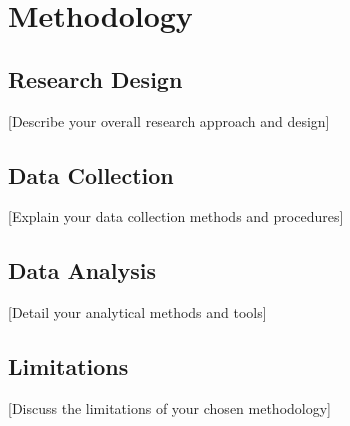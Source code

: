 \chapter{Methodology}

\section{Research Design}
[Describe your overall research approach and design]

\section{Data Collection}
[Explain your data collection methods and procedures]

\section{Data Analysis}
[Detail your analytical methods and tools]

\section{Limitations}
[Discuss the limitations of your chosen methodology] 